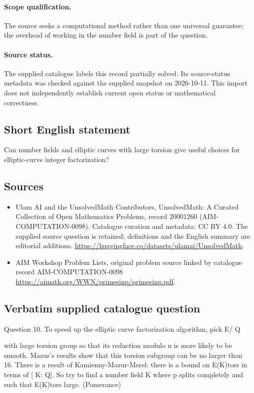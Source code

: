 \documentclass[11pt]{article}
\begin{document}
\paragraph{Scope qualification.}
The source seeks a computational method rather than one universal guarantee; the overhead of working in the number field is part of the question.
\paragraph{Source status.}
The supplied catalogue labels this record partially solved. Its source-status metadata was checked against the supplied snapshot on 2026-10-11. This import does not independently establish current open status or mathematical correctness.
\subsection{Short English statement}
Can number fields and elliptic curves with large torsion give useful choices for elliptic-curve integer factorization?
\subsection{Sources}
\begin{itemize}
\item[S1] Ulam AI and the UnsolvedMath Contributors, UnsolvedMath: A Curated Collection of Open Mathematics Problems, record 20001260 (AIM-COMPUTATION-0098). Catalogue curation and metadata: CC BY 4.0. The supplied source question is retained; definitions and the English summary are editorial additions.
\url{https://huggingface.co/datasets/ulamai/UnsolvedMath}.
\item[S2] AIM Workshop Problem Lists, original problem source linked by catalogue record AIM-COMPUTATION-0098
\url{https://aimath.org/WWN/primesinp/primesinp.pdf}.
\end{itemize}
\subsection{Verbatim supplied catalogue question}
Question 10. To speed up the elliptic curve factorization algorithm, pick E/ Q

with large torsion group so that its reduction modulo n is more likely to be smooth. Mazur's results show that this torsion subgroup can be no larger than 16. There is a result of Kamienny-Mazur-Merel: there is a bound on E(K)tors in terms of [ K: Q]. So try to find a number field K where p splits completely and such that E(K)tors large. (Pomerance)
\end{document}
